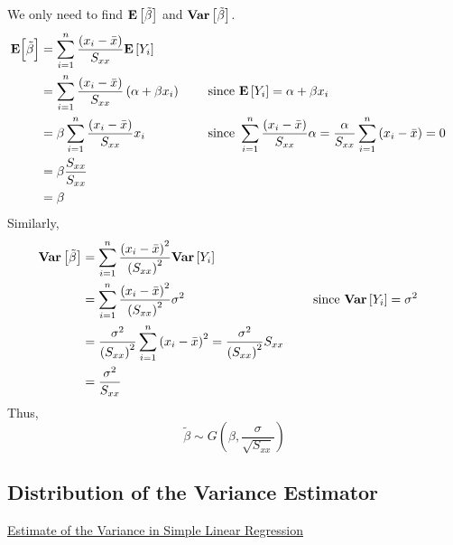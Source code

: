 We only need to find $ \bm{\mathrm{E}}\left[\tilde{\beta}\right] $ and $ \bm{\mathrm{Var}}\left[\tilde{\beta}\right] $.
\[\begin{aligned}
        \bm{\mathrm{E}}\Bigl[\tilde{\beta}\Bigr]
         & =\sum_{i=1}^{n} \frac{\left(x_{i}-\bar{x}\right)}{S_{x x}} \bm{\mathrm{E}}\left[Y_{i}\right]                                                                                                                                                                                   \\
         & =\sum_{i=1}^{n} \frac{\left(x_{i}-\bar{x}\right)}{S_{x x}}\left(\alpha+\beta x_{i}\right) & \quad & \text { since } \bm{\mathrm{E}}\left[Y_{i}\right]=\alpha+\beta x_{i}                                                                                                       \\
         & =\beta \sum_{i=1}^{n} \frac{\left(x_{i}-\bar{x}\right)}{S_{x x}} x_{i}                    &       & \text { since } \sum_{i=1}^{n} \frac{\left(x_{i}-\bar{x}\right)}{S_{x x}} \alpha=\frac{\alpha}{S_{x x}} \sum_{i=1}^{n}\left(x_{i}-\bar{x}\right)=0 \\
         & =\beta \frac{S_{x x}}{S_{x x}}                                                                                                                                                                                                                         \\
         & =\beta
    \end{aligned}
\]
Similarly,
\[\begin{aligned}
        \bm{\mathrm{Var}}\left[\tilde{\beta}\right]
         & =\sum_{i=1}^{n} \frac{\left(x_{i}-\bar{x}\right)^{2}}{\left(S_{x x}\right)^{2}} \bm{\mathrm{Var}}\left[Y_{i}\right]                                                                                                    \\
         & =\sum_{i=1}^{n} \frac{\left(x_{i}-\bar{x}\right)^{2}}{\left(S_{x x}\right)^{2}} \sigma^{2}                                                    & \quad & \text { since } \bm{\mathrm{Var}}\left[Y_{i}\right]=\sigma^{2} \\
         & =\frac{\sigma^{2}}{\left(S_{x x}\right)^{2}} \sum_{i=1}^{n}\left(x_{i}-\bar{x}\right)^{2}=\frac{\sigma^{2}}{\left(S_{x x}\right)^{2}} S_{x x}                                                  \\
         & =\frac{\sigma^{2}}{S_{x x}}
    \end{aligned}\]
Thus,
\[\tilde{\beta} \sim G\left(\beta, \frac{\sigma}{\sqrt{S_{x x}}}\right)\]

\subsection{Distribution of the Variance Estimator}
\underline{Estimate of the Variance in Simple Linear Regression}

